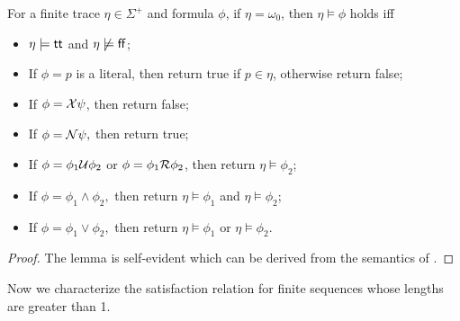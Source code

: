 \begin{lemma}\label{lem:oneSat}
For a finite trace $\eta \in \Sigma^{+}$ and \ltlf formula $\phi$, if $\eta = \omega_0$, then $\eta \models \phi$ holds iff
\begin{itemize}
	\item $\eta \models \tt$ and $\eta \not \models \ff$;
	\item If $\phi=p$ is a literal, then return true if $p \in \eta$, otherwise return false;
	\item If $\phi=\X \psi$, then return false;
	\item If $\phi=\N \psi,$ then return true;
	\item If $\phi=\phi_{1} \U \phi_{2}$ or  $\phi=\phi_{1} \R \phi_{2}$, then return  $\eta \models \phi_{2}$;
	\item If $\phi=\phi_{1} \wedge \phi_{2},$ then return $\eta \models \phi_{1}$ and $\eta \models \phi_{2}$;
	\item If $\phi=\phi_{1} \vee \phi_{2},$ then return $\eta \models \phi_{1}$ or $\eta \models \phi_{2}$.
\end{itemize}
\end{lemma}

\begin{proof}
The lemma is self-evident which can be derived from the semantics of \ltlf.
\end{proof}

Now we characterize the satisfaction relation for finite sequences whose lengths are greater than 1.

